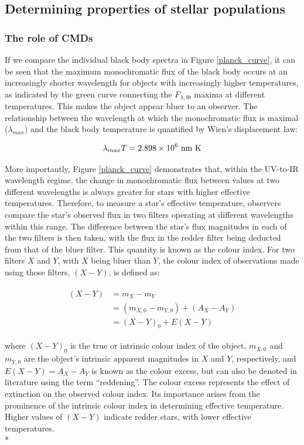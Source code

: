 \documentclass[12pt, a4paper]{report}
\begin{document}
\subsection{Determining properties of stellar populations}
\subsubsection{The role of CMDs} \label{CMDs_intro}
If we compare the individual black body spectra in Figure \ref{planck_curve}, it can be seen that the maximum monochromatic flux of the black body occurs at an increasingly shorter wavelength for objects with increasingly higher temperatures, as indicated by the green curve connecting the $F_{\lambda,bb}$ maxima at different temperatures. This makes the object appear bluer to an observer. The relationship between the wavelength at which the monochromatic flux is maximal ($\lambda_{max}$) and the black body temperature is quantified by Wien's displacement law:

\begin{equation}
\lambda_{max} T = 2.898 \times 10^{6} \textnormal{ nm K}
\label{wien_eq}
\end{equation}

More importantly, Figure \ref{planck_curve} demonstrates that, within the UV-to-IR wavelength regime, the change in monochromatic flux between values at two different wavelengths is always greater for stars with higher effective temperatures. Therefore, to measure a star's effective temperature, observers compare the star's observed flux in two filters operating at different wavelengths within this range. The difference between the star's flux magnitudes in each of the two filters is then taken, with the flux in the redder filter being deducted from that of the bluer filter. This quantity is known as the colour index. For two filters $X$ and $Y$, with $X$ being bluer than $Y$, the colour index of observations made using those filters, $(X-Y)$, is defined as:

\begin{align}
\begin{split}
(X-Y) &= m_{X} - m_{Y} \\
 &= (m_{X,0} - m_{Y,0}) + (A_{X} - A_{Y}) \\
 &= (X-Y)_{0} + E(X-Y)
\end{split}
\label{colour_index}
\end{align}

where $(X-Y)_{0}$ is the true or intrinsic colour index of the object, $m_{X,0}$ and $m_{Y,0}$ are the object's intrinsic apparent magnitudes in $X$ and $Y$, respectively, and $E(X-Y) = A_{X} - A_{Y}$ is known as the colour excess, but can also be denoted in literature using the term ``reddening''. The colour excess represents the effect of extinction on the observed colour index. Its importance arises from the prominence of the intrinsic colour index in determining effective temperature. Higher values of $(X-Y)$ indicate redder stars, with lower effective temperatures.\\*
\end{document}
